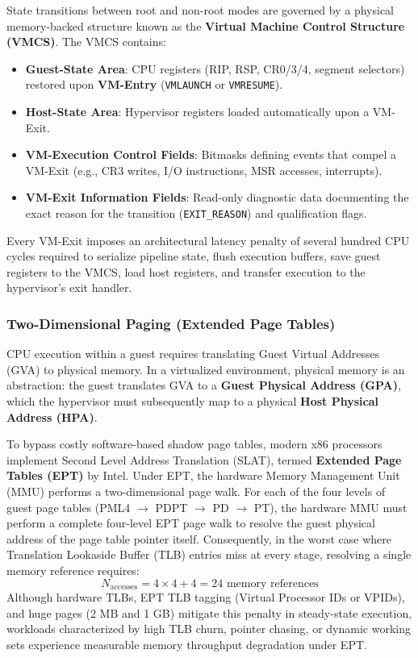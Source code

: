 State transitions between root and non-root modes are governed by a physical memory-backed structure known as the \textbf{Virtual Machine Control Structure (VMCS)}. The VMCS contains:
\begin{itemize}
    \item \textbf{Guest-State Area}: CPU registers (RIP, RSP, CR0/3/4, segment selectors) restored upon \textbf{VM-Entry} (\texttt{VMLAUNCH} or \texttt{VMRESUME}).
    \item \textbf{Host-State Area}: Hypervisor registers loaded automatically upon a VM-Exit.
    \item \textbf{VM-Execution Control Fields}: Bitmasks defining events that compel a VM-Exit (e.g., CR3 writes, I/O instructions, MSR accesses, interrupts).
    \item \textbf{VM-Exit Information Fields}: Read-only diagnostic data documenting the exact reason for the transition (\texttt{EXIT\_REASON}) and qualification flags.
\end{itemize}

Every VM-Exit imposes an architectural latency penalty of several hundred CPU cycles required to serialize pipeline state, flush execution buffers, save guest registers to the VMCS, load host registers, and transfer execution to the hypervisor's exit handler.

\subsubsection{Two-Dimensional Paging (Extended Page Tables)}
CPU execution within a guest requires translating Guest Virtual Addresses (GVA) to physical memory. In a virtualized environment, physical memory is an abstraction: the guest translates GVA to a \textbf{Guest Physical Address (GPA)}, which the hypervisor must subsequently map to a physical \textbf{Host Physical Address (HPA)}.

To bypass costly software-based shadow page tables, modern x86 processors implement Second Level Address Translation (SLAT), termed \textbf{Extended Page Tables (EPT)} by Intel. Under EPT, the hardware Memory Management Unit (MMU) performs a two-dimensional page walk. For each of the four levels of guest page tables (PML4 $\to$ PDPT $\to$ PD $\to$ PT), the hardware MMU must perform a complete four-level EPT page walk to resolve the guest physical address of the page table pointer itself. Consequently, in the worst case where Translation Lookaside Buffer (TLB) entries miss at every stage, resolving a single memory reference requires:
\begin{equation}
    N_{\text{accesses}} = 4 \times 4 + 4 = 24 \text{ memory references}
    \label{eq:ept_overhead}
\end{equation}
Although hardware TLBs, EPT TLB tagging (Virtual Processor IDs or VPIDs), and huge pages (2 MB and 1 GB) mitigate this penalty in steady-state execution, workloads characterized by high TLB churn, pointer chasing, or dynamic working sets experience measurable memory throughput degradation under EPT.

